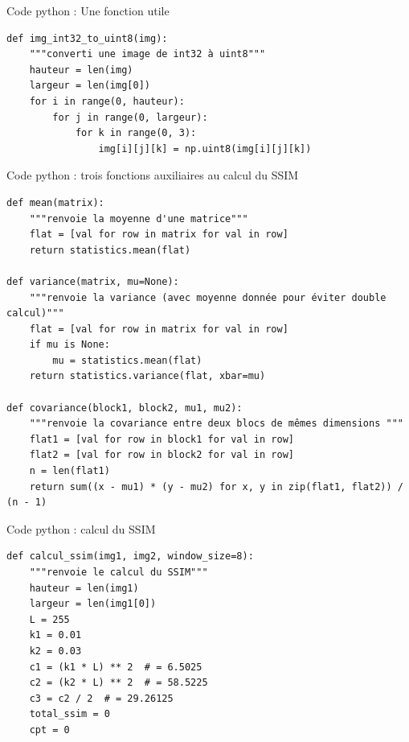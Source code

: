 \documentclass[xcolor=dvipsnames]{beamer}
\begin{document}
\begin{frame}[fragile]{Code python : Une fonction utile}
    \begin{lstlisting}[style=pythonStyle]
def img_int32_to_uint8(img):
    """converti une image de int32 à uint8"""
    hauteur = len(img)
    largeur = len(img[0])
    for i in range(0, hauteur):
        for j in range(0, largeur):
            for k in range(0, 3):
                img[i][j][k] = np.uint8(img[i][j][k])
    \end{lstlisting}
\end{frame}

\begin{frame}[fragile]{Code python : trois fonctions auxiliaires au calcul du SSIM}
    \begin{lstlisting}[style=pythonStyle]
def mean(matrix):
    """renvoie la moyenne d'une matrice"""
    flat = [val for row in matrix for val in row]
    return statistics.mean(flat)

def variance(matrix, mu=None):
    """renvoie la variance (avec moyenne donnée pour éviter double calcul)"""
    flat = [val for row in matrix for val in row]
    if mu is None:
        mu = statistics.mean(flat)
    return statistics.variance(flat, xbar=mu)

def covariance(block1, block2, mu1, mu2):
    """renvoie la covariance entre deux blocs de mêmes dimensions """
    flat1 = [val for row in block1 for val in row]
    flat2 = [val for row in block2 for val in row]
    n = len(flat1)
    return sum((x - mu1) * (y - mu2) for x, y in zip(flat1, flat2)) / (n - 1)

    \end{lstlisting}
\end{frame}

\begin{frame}[fragile]{Code python : calcul du SSIM}
    \begin{lstlisting}[style=pythonStyle]
def calcul_ssim(img1, img2, window_size=8):
    """renvoie le calcul du SSIM"""
    hauteur = len(img1)
    largeur = len(img1[0])
    L = 255
    k1 = 0.01
    k2 = 0.03
    c1 = (k1 * L) ** 2  # = 6.5025
    c2 = (k2 * L) ** 2  # = 58.5225
    c3 = c2 / 2  # = 29.26125
    total_ssim = 0
    cpt = 0
    \end{lstlisting}
\end{frame}
\end{document}
